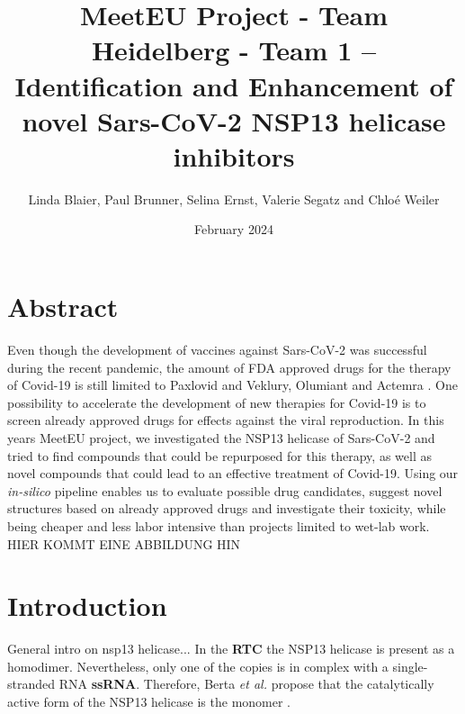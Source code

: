 \documentclass[11pt, letterpaper, titlepage]{article}
\title{MeetEU Project - Team Heidelberg - Team 1 -- \\ Identification and Enhancement of novel Sars-CoV-2 NSP13 helicase inhibitors}
\author{Linda Blaier, Paul Brunner, Selina Ernst, Valerie Segatz and Chlo\'{e} Weiler}
\date{February 2024}
\renewcommand{\cite}{\parencite}
\begin{document}
\maketitle

\ihead{\headmark}
\cfoot{\pagemark}   %

\section{Abstract}
Even though the development of vaccines against Sars-CoV-2 was successful during the recent pandemic, the amount of FDA approved drugs for the therapy of Covid-19 is still limited to Paxlovid and Veklury, Olumiant and Actemra \cite{FDA_COVID}. One possibility to accelerate the development of new therapies for Covid-19 is to screen already approved drugs for effects against the viral reproduction. In this years MeetEU project, we investigated the NSP13 helicase of Sars-CoV-2 and tried to find compounds that could be repurposed for this therapy, as well as novel compounds that could lead to an effective treatment of Covid-19. Using our \textit{in-silico} pipeline enables us to evaluate possible drug candidates, suggest novel structures based on already approved drugs and investigate their toxicity, while being cheaper and less labor intensive than projects limited to wet-lab work. 
HIER KOMMT EINE ABBILDUNG HIN


\FloatBarrier


\section{Introduction}
General intro on nsp13 helicase... 
In the \textbf{RTC} the NSP13 helicase is present as a homodimer. Nevertheless, only one of the copies is in complex with a single-stranded RNA \textbf{ssRNA}. Therefore, Berta \textit{et al.} propose that the catalytically active form of the NSP13 helicase is the monomer \cite{Berta_2021}.  
\end{document}
